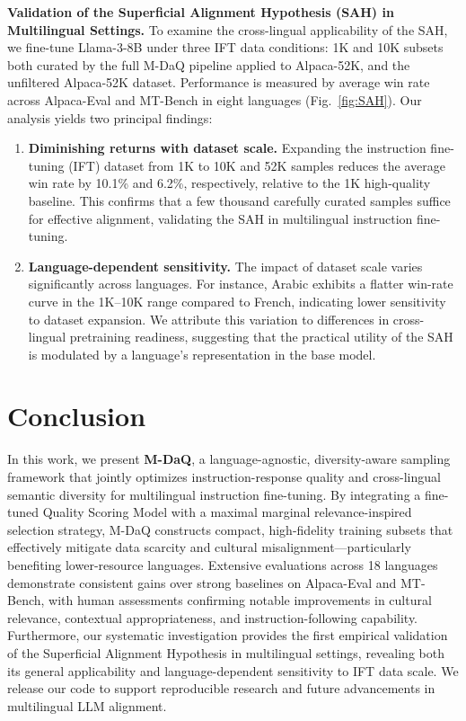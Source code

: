 \documentclass[sigconf]{acmart}
\begin{document}
\textbf{Validation of the Superficial Alignment Hypothesis (SAH) in Multilingual Settings.} To examine the cross-lingual applicability of the SAH, we fine-tune Llama-3-8B under three IFT data conditions: 1K and 10K subsets both curated by the full M-DaQ pipeline applied to Alpaca-52K, and the unfiltered Alpaca-52K dataset. Performance is measured by average win rate across Alpaca-Eval and MT-Bench in eight languages (Fig.~\ref{fig:SAH}). Our analysis yields two principal findings:
\begin{enumerate}
    \item \textbf{Diminishing returns with dataset scale.} Expanding the instruction fine-tuning (IFT) dataset from 1K to 10K and 52K samples reduces the average win rate by 10.1\% and 6.2\%, respectively, relative to the 1K high-quality baseline. This confirms that a few thousand carefully curated samples suffice for effective alignment, validating the SAH in multilingual instruction fine-tuning.
    \item \textbf{Language-dependent sensitivity.} The impact of dataset scale varies significantly across languages. For instance, Arabic exhibits a flatter win-rate curve in the 1K–10K range compared to French, indicating lower sensitivity to dataset expansion. We attribute this variation to differences in cross-lingual pretraining readiness, suggesting that the practical utility of the SAH is modulated by a language's representation in the base model.
\end{enumerate}

\section{Conclusion}
\label{sec:conclusion}

In this work, we present \textbf{M-DaQ}, a language-agnostic, diversity-aware sampling framework that jointly optimizes instruction-response quality and cross-lingual semantic diversity for multilingual instruction fine-tuning. By integrating a fine-tuned Quality Scoring Model with a maximal marginal relevance-inspired selection strategy, M-DaQ constructs compact, high-fidelity training subsets that effectively mitigate data scarcity and cultural misalignment—particularly benefiting lower-resource languages. Extensive evaluations across 18 languages demonstrate consistent gains over strong baselines on Alpaca-Eval and MT-Bench, with human assessments confirming notable improvements in cultural relevance, contextual appropriateness, and instruction-following capability. Furthermore, our systematic investigation provides the first empirical validation of the Superficial Alignment Hypothesis in multilingual settings, revealing both its general applicability and language-dependent sensitivity to IFT data scale. We release our code to support reproducible research and future advancements in multilingual LLM alignment.



\end{document}
